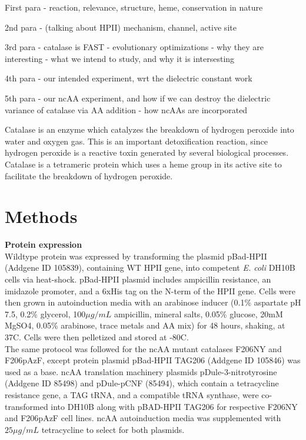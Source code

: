 \documentclass[journal=jacsat,manuscript=article]{achemso}
\begin{document}
First para
- reaction, relevance, structure, heme, conservation in nature

2nd para
- (talking about HPII) mechanism, channel, active site

3rd para
- catalase is FAST
- evolutionary optimizations
- why they are interesting
- what we intend to study, and why it is intersesting

4th para
- our intended experiment, wrt the dielectric constant work

5th para
- our ncAA experiment, and how if we can destroy the dielectric variance of catalase via AA addition
- how ncAAs are incorporated

Catalase is an enzyme which catalyzes the breakdown of hydrogen peroxide into water and oxygen gas. This is an important detoxification reaction, since hydrogen peroxide is a reactive toxin generated by several biological processes. Catalase is a tetrameric protein which uses a heme group in its active site to facilitate the breakdown of hydrogen peroxide. 

\section{Methods}
\textbf{Protein expression}\\
Wildtype protein was expressed by transforming the plasmid pBad-HPII (Addgene ID 105839), containing WT HPII gene, into competent \textit{E. coli} DH10B cells via heat-shock. pBad-HPII plasmid includes ampicillin resistance, an imidazole promoter, and a 6xHis tag on the N-term of the HPII gene. Cells were then grown in autoinduction media with an arabinose inducer (0.1\% aspartate pH 7.5, 0.2\% glycerol, 100$\mu g / mL$ ampicillin, mineral salts, 0.05\% glucose, 20mM MgSO4, 0.05\% arabinose, trace metals and AA mix) for 48 hours, shaking, at 37C. Cells were then pelletized and stored at -80C.\\

The same protocol was followed for the ncAA mutant catalases F206NY and F206pAzF, except protein plasmid pBad-HPII TAG206 (Addgene ID 105846) was used as a base. ncAA translation machinery plasmids pDule-3-nitrotyrosine (Addgene ID 85498) and pDule-pCNF (85494), which contain a tetracycline resistance gene, a TAG tRNA, and a compatible tRNA synthase, were co-transformed into DH10B along with pBAD-HPII TAG206 for respective F206NY and F206pAzF cell lines. ncAA autoinduction media was supplemented with $25\mu g / mL$ tetracycline to select for both plasmids.\\
\end{document}
